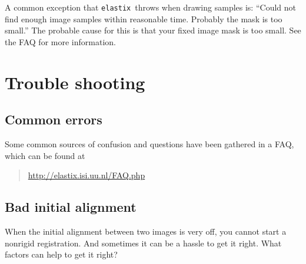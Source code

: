 \documentclass[]{report}
\newcommand{\elastix}{\texttt{elastix}}
\begin{document}
A common exception that \elastix\ throws when drawing samples is:
``Could not find enough image samples within reasonable time.
Probably the mask is too small.'' The probable cause for this is
that your fixed image mask is too small. See the FAQ for more
information.

\section{Trouble shooting}

\subsection{Common errors}

Some common sources of confusion and questions have been gathered in
a FAQ, which can be found at
\begin{quote}
\url{http://elastix.isi.uu.nl/FAQ.php}
\end{quote}

\subsection{Bad initial alignment}

When the initial alignment between two images is very off, you cannot
start a nonrigid registration. And sometimes it can be a hassle to
get it right. What factors can help to get it right?
\end{document}
